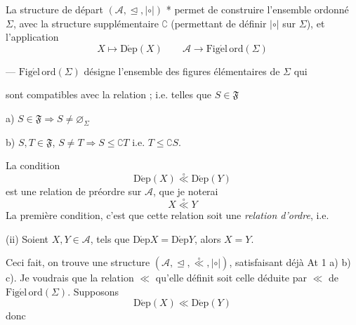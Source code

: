 \documentclass[11pt,a4paper]{article}
\begin{document}
La structure de départ 
$(\mathcal{A}, \trianglelefteq, \mathrel{|\circ|})$ * permet de construire
l'ensemble ordonné $\Sigma$, avec la structure supplémentaire
$\complement$ (permettant de définir $\mathrel{|\circ|}$ sur $\Sigma$), et
l'application
\[
  X \longmapsto \operatorname{D\acute{e}p}(X) \qquad
  \mathcal{A} \longrightarrow \operatorname{Fig\acute{e}l\,ord}(\Sigma)
\]

--- $\operatorname{Fig\acute{e}l\,ord}(\Sigma)$ désigne l'ensemble
 des figures élémentaires  
de $\Sigma$ qui



sont compatibles avec la relation 
 \struck{\ill{}}  ;
\struck{\ill{}} i.e. telles que  $S \in \mathfrak{F}$

a) $S \in \mathfrak{F} \Longrightarrow S \neq \varnothing_{\Sigma}$

b) $S, T \in \mathfrak{F}$, $S \neq T \Longrightarrow
    S \leq \complement T$ i.e. $T \leq \complement S$.



La condition
\[
  \operatorname{D\acute{e}p}(X) \overset{\circ}{\ll} \operatorname{D\acute{e}p}(Y)
\]
est une relation de préordre sur $\mathcal{A}$, que je noterai
\[
  X \overset{\circ}{\ll} Y
\]
La première condition, c'est que cette relation soit une \emph{relation
d'ordre}, i.e. 

(ii) Soient $X, Y \in \mathcal{A}$, tels que
$\operatorname{D\acute{e}p} X = \operatorname{D\acute{e}p} Y$, alors $X = Y$.

Ceci fait, on trouve une structure
$(\mathcal{A}, \trianglelefteq, \overset{\circ}{\ll}, \mathrel{|\circ|})$,
satisfaisant déjà At 1 a) b) c). Je voudrais que la relation $\ll$
qu'elle définit soit celle  déduite par $\ll$ de
$\operatorname{Fig\acute{e}l\,ord}(\Sigma)$.  Supposons  
\[
  \operatorname{D\acute{e}p}(X) \ll \operatorname{D\acute{e}p}(Y)
\]
donc

\end{document}
